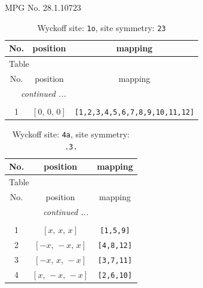 \documentclass[fleqn,8pt]{jsarticle}
\begin{document}
\setcounter{MaxMatrixCols}{32}

\renewcommand{\tablename}{Table~}
\renewcommand{\figurename}{Figure~}
\begin{center}
\LARGE
MPG No. 28.1.107\quad$23$
\end{center}
\renewcommand{\arraystretch}{1.2}
\begin{longtable}{ccc}
\caption{Wyckoff site: {\tt 1o}, site symmetry: {\tt 23}}
 \\
 \hline \hline
No. & position & mapping \\ \hline \endfirsthead

\multicolumn{2}{l}{\tablename\ \thetable{}} \\
 \hline \hline
No. & position & mapping \\ \hline \endhead

 \hline \hline
\multicolumn{2}{r}{\footnotesize\it continued ...} \\ \endfoot

 \hline \hline
\multicolumn{2}{r}{} \\ \endlastfoot

1 & $\left[ 0,\, 0,\, 0 \right]$ & {\tt [1,2,3,4,5,6,7,8,9,10,11,12]} \\
\end{longtable}
\renewcommand{\arraystretch}{1.2}
\begin{longtable}{ccc}
\caption{Wyckoff site: {\tt 4a}, site symmetry: {\tt .3.}}
 \\
 \hline \hline
No. & position & mapping \\ \hline \endfirsthead

\multicolumn{2}{l}{\tablename\ \thetable{}} \\
 \hline \hline
No. & position & mapping \\ \hline \endhead

 \hline \hline
\multicolumn{2}{r}{\footnotesize\it continued ...} \\ \endfoot

 \hline \hline
\multicolumn{2}{r}{} \\ \endlastfoot

1 & $\left[ x,\, x,\, x \right]$ & {\tt [1,5,9]} \\ \hline
2 & $\left[ - x,\, - x,\, x \right]$ & {\tt [4,8,12]} \\ \hline
3 & $\left[ - x,\, x,\, - x \right]$ & {\tt [3,7,11]} \\ \hline
4 & $\left[ x,\, - x,\, - x \right]$ & {\tt [2,6,10]} \\
\end{longtable}
\end{document}
